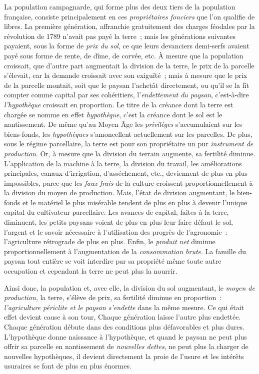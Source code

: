 \documentclass[twoside]{book} %
\begin{document}
La population campagnarde, qui forme plus des deux tiers de la population française, consiste principalement en ces \emph{propriétaires fonciers} que l’on qualifie de libres. La première génération, affranchie gratuitement des charges féodales par la révolution de 1789 n’avait pas payé la terre ; mais les générations suivantes payaient, sous la forme de \emph{prix du sol}, ce que leurs devanciers demi-serfs avaient payé sous forme de rente, de dîme, de corvée, etc. À mesure que la population croissait, que d’autre part augmentait la division de la terre, le prix de la parcelle s’élevait, car la demande croissait avec son exiguïté ; mais à mesure que le prix de la parcelle montait, soit que le paysan l’achetât directement, ou qu’il se la fît compter comme capital par ses cohéritiers, l’\emph{endettement du paysan}, c’est-à-dire \emph{l’hypothèque} croissait en proportion. Le titre de la créance dont la terre est chargée se nomme en effet \emph{hypothèque}, c’est la créance dont le sol est le nantissement. De même qu’au Moyen Âge les \emph{privilèges} s’accumulaient sur les biens-fonds, les \emph{hypothèques} s’amoncellent actuellement sur les parcelles. De plus, sous le régime parcellaire, la terre est pour son propriétaire un pur \emph{instrument de production}. Or, à mesure que la division du terrain augmente, sa fertilité diminue. L’application de la machine à la terre, la division du travail, les améliorations principales, canaux d’irrigation, d’asséchement, etc., deviennent de plus en plus impossibles, parce que les \emph{faux-frais} de la culture croissent proportionnellement à la division du moyen de production. Mais, l’état de division augmentant, le bien-fonds et le matériel le plus misérable tendent de plus en plus à devenir l’unique capital du cultivateur parcellaire. Les avances de capital, faites à la terre, diminuent, les petits paysans voient de plus en plus leur faire défaut le sol, l’argent et le savoir nécessaire à l’utilisation des progrès de l’agronomie : l’agriculture rétrograde de plus en plus. Enfin, le \emph{produit net} diminue proportionnellement à l’augmentation de la \emph{consommation brute}. La famille du paysan tout entière se voit interdire par sa propriété même toute autre occupation et cependant la terre ne peut plus la nourrir.\par
Ainsi donc, la population et, avec elle, la division du sol augmentant, le \emph{moyen de production}, la terre, s’élève de prix, sa fertilité diminue en proportion : \emph{l’agriculture périclite et le paysan s’endette} dans la même mesure. Ce qui était effet devient cause à son tour, Chaque génération laisse l’autre plus endettée. Chaque génération débute dans des conditions plus défavorables et plus dures. L’hypothèque donne naissance à l’hypothèque, et quand le paysan ne peut plus offrir sa parcelle en nantissement de \emph{nouvelles dettes}, ne peut plus la charger de nouvelles hypothèques, il devient directement la proie de l’usure et les intérêts usuraires se font de plus en plus énormes.\par
\end{document}
